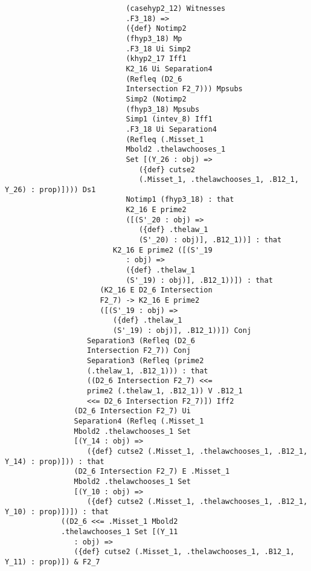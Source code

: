 \documentclass[12pt]{article}
\begin{document}
\begin{verbatim}
                            (casehyp2_12) Witnesses 
                            .F3_18) => 
                            ({def} Notimp2 
                            (fhyp3_18) Mp 
                            .F3_18 Ui Simp2 
                            (khyp2_17 Iff1 
                            K2_16 Ui Separation4 
                            (Refleq (D2_6 
                            Intersection F2_7))) Mpsubs 
                            Simp2 (Notimp2 
                            (fhyp3_18) Mpsubs 
                            Simp1 (intev_8) Iff1 
                            .F3_18 Ui Separation4 
                            (Refleq (.Misset_1 
                            Mbold2 .thelawchooses_1 
                            Set [(Y_26 : obj) => 
                               ({def} cutse2 
                               (.Misset_1, .thelawchooses_1, .B12_1, Y_26) : prop)]))) Ds1 
                            Notimp1 (fhyp3_18) : that 
                            K2_16 E prime2 
                            ([(S'_20 : obj) => 
                               ({def} .thelaw_1 
                               (S'_20) : obj)], .B12_1))] : that 
                         K2_16 E prime2 ([(S'_19 
                            : obj) => 
                            ({def} .thelaw_1 
                            (S'_19) : obj)], .B12_1))]) : that 
                      (K2_16 E D2_6 Intersection 
                      F2_7) -> K2_16 E prime2 
                      ([(S'_19 : obj) => 
                         ({def} .thelaw_1 
                         (S'_19) : obj)], .B12_1))]) Conj 
                   Separation3 (Refleq (D2_6 
                   Intersection F2_7)) Conj 
                   Separation3 (Refleq (prime2 
                   (.thelaw_1, .B12_1))) : that 
                   ((D2_6 Intersection F2_7) <<= 
                   prime2 (.thelaw_1, .B12_1)) V .B12_1 
                   <<= D2_6 Intersection F2_7)]) Iff2 
                (D2_6 Intersection F2_7) Ui 
                Separation4 (Refleq (.Misset_1 
                Mbold2 .thelawchooses_1 Set 
                [(Y_14 : obj) => 
                   ({def} cutse2 (.Misset_1, .thelawchooses_1, .B12_1, Y_14) : prop)])) : that 
                (D2_6 Intersection F2_7) E .Misset_1 
                Mbold2 .thelawchooses_1 Set 
                [(Y_10 : obj) => 
                   ({def} cutse2 (.Misset_1, .thelawchooses_1, .B12_1, Y_10) : prop)])]) : that 
             ((D2_6 <<= .Misset_1 Mbold2 
             .thelawchooses_1 Set [(Y_11 
                : obj) => 
                ({def} cutse2 (.Misset_1, .thelawchooses_1, .B12_1, Y_11) : prop)]) & F2_7 

\end{verbatim}
\end{document}
